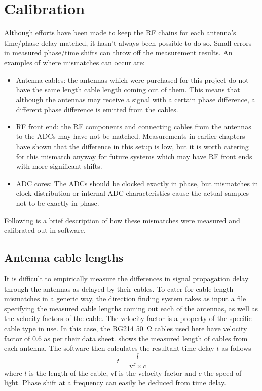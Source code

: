 \section{Calibration}


Although efforts have been made to keep the RF chains for each antenna's time/phase delay matched, it hasn't always been possible to do so. Small errors in measured phase/time shifts can throw off the measurement results. An examples of where mismatches can occur are:

\begin{itemize}
  \item Antenna cables: the antennas which were purchased for this project do not have the same length cable length coming out of them. This means that although the antennas may receive a signal with a certain phase difference, a different phase difference is emitted from the cables.
  \item RF front end: the RF components and connecting cables from the antennas to the ADCs may have not be matched. Measurements in earlier chapters have shown that the difference in this setup is low, but it is worth catering for this mismatch anyway for future systems which may have RF front ends with more significant shifts.
  \item ADC cores: The ADCs should be clocked exactly in phase, but mismatches in clock distribution or internal ADC characteristics cause the actual samples not to be exactly in phase.
\end{itemize}

Following is a brief description of how these mismatches were measured and calibrated out in software.

\subsection{Antenna cable lengths}
It is difficult to empirically measure the differences in signal propagation delay through the antennas as delayed by their cables. To cater for cable length mismatches in a generic way, the direction finding system takes as input a file specifying the measured cable lengths coming out each of the antennas, as well as the velocity factors of the cable. The velocity factor is a property of the specific cable type in use. In this case, the RG214 \SI{50}{\ohm} cables used here have velocity factor of 0.6 as per their data sheet.  shows the measured length of cables from each antenna. The software then calculates the resultant time delay \(t\) as follows
\begin{equation}
    t = \frac{l}{\text{vf} \times c}
\end{equation}
where \(l\) is the length of the cable, \(\text{vf}\) is the velocity factor and \(c\) the speed of light. Phase shift at a frequency can easily be deduced from time delay.

